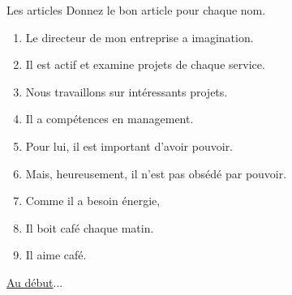 \begin{frame}{Les articles}
  Donnez le bon article pour chaque nom.
  \begin{enumerate}
    \item Le directeur de mon entreprise a \underline{} imagination.
    \item Il est actif et examine \underline{} projets de chaque service.
    \item Nous travaillons sur \underline{} intéressants projets.
    \item Il a \underline{} compétences en management.
    \item Pour lui, il est important d'avoir \underline{} pouvoir.
    \item Mais, heureusement, il n'est pas obsédé par \underline{} pouvoir.
    \item Comme il a besoin \underline{} énergie,
    \item Il boit \underline{} café chaque matin.
    \item Il aime \underline{} café.
  \end{enumerate}
  \vspace{0.25cm}
  \raggedleft\hyperlink{début}{Au début}...
\end{frame}
